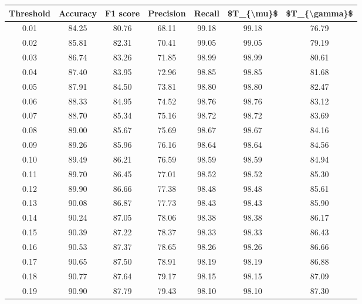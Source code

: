\begin{tabular}{|c|c|c|c|c|c|c|}
\hline
 Threshold &  Accuracy &  F1 score &  Precision &  Recall &  \$T\_\{\textbackslash mu\}\$ &  \$T\_\{\textbackslash gamma\}\$ \\
\hline
      0.01 &     84.25 &     80.76 &      68.11 &   99.18 &      99.18 &         76.79 \\
      0.02 &     85.81 &     82.31 &      70.41 &   99.05 &      99.05 &         79.19 \\
      0.03 &     86.74 &     83.26 &      71.85 &   98.99 &      98.99 &         80.61 \\
      0.04 &     87.40 &     83.95 &      72.96 &   98.85 &      98.85 &         81.68 \\
      0.05 &     87.91 &     84.50 &      73.81 &   98.80 &      98.80 &         82.47 \\
      0.06 &     88.33 &     84.95 &      74.52 &   98.76 &      98.76 &         83.12 \\
      0.07 &     88.70 &     85.34 &      75.16 &   98.72 &      98.72 &         83.69 \\
      0.08 &     89.00 &     85.67 &      75.69 &   98.67 &      98.67 &         84.16 \\
      0.09 &     89.26 &     85.96 &      76.16 &   98.64 &      98.64 &         84.56 \\
      0.10 &     89.49 &     86.21 &      76.59 &   98.59 &      98.59 &         84.94 \\
      0.11 &     89.70 &     86.45 &      77.01 &   98.52 &      98.52 &         85.30 \\
      0.12 &     89.90 &     86.66 &      77.38 &   98.48 &      98.48 &         85.61 \\
      0.13 &     90.08 &     86.87 &      77.73 &   98.43 &      98.43 &         85.90 \\
      0.14 &     90.24 &     87.05 &      78.06 &   98.38 &      98.38 &         86.17 \\
      0.15 &     90.39 &     87.22 &      78.37 &   98.33 &      98.33 &         86.43 \\
      0.16 &     90.53 &     87.37 &      78.65 &   98.26 &      98.26 &         86.66 \\
      0.17 &     90.65 &     87.50 &      78.91 &   98.19 &      98.19 &         86.88 \\
      0.18 &     90.77 &     87.64 &      79.17 &   98.15 &      98.15 &         87.09 \\
      0.19 &     90.90 &     87.79 &      79.43 &   98.10 &      98.10 &         87.30 \\

\end{tabular}

